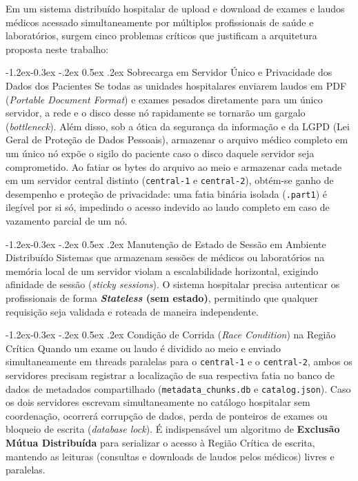 \documentclass[12pt]{article}
\makeatletter
\renewcommand\subsection{\@startsection{subsection}{2}{\z@}%
    {-1.2ex\@plus -0.3ex \@minus -.2ex}%
    {0.5ex \@plus .2ex}%
    {\normalfont\normalsize\bfseries}}
\makeatother
\begin{document}
Em um sistema distribuído hospitalar de upload e download de exames e laudos médicos acessado simultaneamente por múltiplos profissionais de saúde e laboratórios, surgem cinco problemas críticos que justificam a arquitetura proposta neste trabalho:

\subsection{Sobrecarga em Servidor Único e Privacidade dos Dados dos Pacientes}
Se todas as unidades hospitalares enviarem laudos em PDF (\textit{Portable Document Format}) e exames pesados diretamente para um único servidor, a rede e o disco desse nó rapidamente se tornarão um gargalo (\textit{bottleneck}). Além disso, sob a ótica da segurança da informação e da LGPD (Lei Geral de Proteção de Dados Pessoais), armazenar o arquivo médico completo em um único nó expõe o sigilo do paciente caso o disco daquele servidor seja comprometido. Ao fatiar os bytes do arquivo ao meio e armazenar cada metade em um servidor central distinto (\texttt{central-1} e \texttt{central-2}), obtém-se ganho de desempenho e proteção de privacidade: uma fatia binária isolada (\texttt{.part1}) é ilegível por si só, impedindo o acesso indevido ao laudo completo em caso de vazamento parcial de um nó.

\subsection{Manutenção de Estado de Sessão em Ambiente Distribuído}
Sistemas que armazenam sessões de médicos ou laboratórios na memória local de um servidor violam a escalabilidade horizontal, exigindo afinidade de sessão (\textit{sticky sessions}). O sistema hospitalar precisa autenticar os profissionais de forma \textbf{\textit{Stateless} (sem estado)}, permitindo que qualquer requisição seja validada e roteada de maneira independente.

\subsection{Condição de Corrida (\textit{Race Condition}) na Região Crítica}
Quando um exame ou laudo é dividido ao meio e enviado simultaneamente em threads paralelas para o \texttt{central-1} e o \texttt{central-2}, ambos os servidores precisam registrar a localização de sua respectiva fatia no banco de dados de metadados compartilhado (\texttt{metadata\_chunks.db} e \texttt{catalog.json}). Caso os dois servidores escrevam simultaneamente no catálogo hospitalar sem coordenação, ocorrerá corrupção de dados, perda de ponteiros de exames ou bloqueio de escrita (\textit{database lock}). É indispensável um algoritmo de \textbf{Exclusão Mútua Distribuída} para serializar o acesso à Região Crítica de escrita, mantendo as leituras (consultas e downloads de laudos pelos médicos) livres e paralelas.
\end{document}
